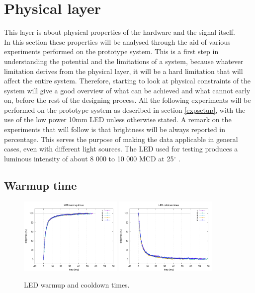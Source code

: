 \section{Physical layer}
\label{physical}


This layer is about physical properties of the hardware and the signal itself.\\
In this section these properties will be analysed through the aid of various experiments performed on the prototype system.
This is a first step in understanding the potential and the limitations of a system, because whatever limitation derives from the physical layer, it will be a hard limitation that will affect the entire system.
Therefore, starting to look at physical constraints of the system will give a good overview of what can be achieved and what cannot early on, before the rest of the designing process.
All the following experiments will be performed on the prototype system as described in section \ref{expsetup}, with the use of the low power 10mm LED unless otherwise stated.
A remark on the experiments that will follow is that brightness will be always reported in percentage.
This serves the purpose of making the data applicable in general cases, even with different light sources.
The LED used for testing produces a luminous intensity of about 8 000 to 10 000 MCD at 25$^{\circ}$ \cite{ledDS}.

\subsection{Warmup time}

\begin{figure}[h]
\centering
\includegraphics[height=140px]{img/warmup1}
\includegraphics[height=140px]{img/warmdown1}
\caption{LED warmup and cooldown times.}
\label{fig:warmup}
\end{figure}

